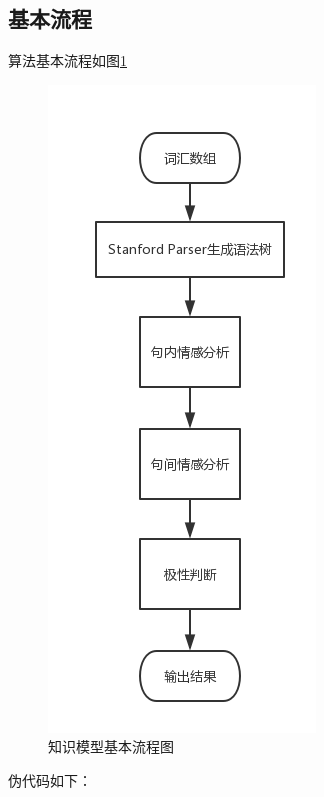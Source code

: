 \subsection{基本流程}
算法基本流程如图\ref{plainmodel1}\par
\begin{figure}
\begin{center}
\includegraphics {graphic/plainmodel1.png}
\caption{知识模型基本流程图 \label{plainmodel1}}
\end{center}
\end{figure}
伪代码如下：\par
\lstset{language=python}
